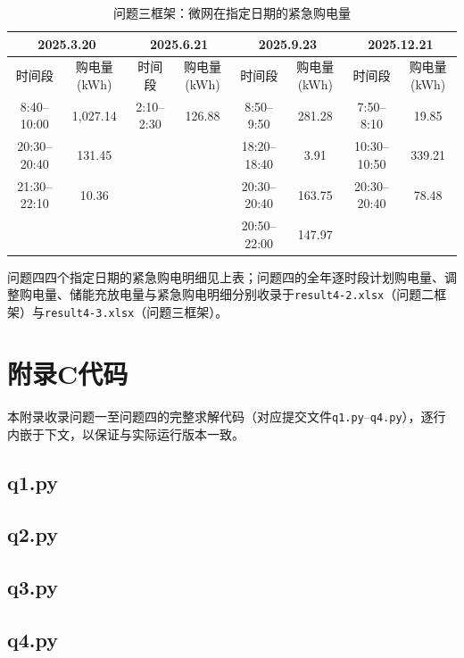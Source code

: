 \begin{table}[H]
  \centering
  \caption{问题三框架：微网在指定日期的紧急购电量}
  \label{tab:q4-3-specific-emergency}
  \tiny
  \renewcommand{\arraystretch}{1.2}
  \begin{tabular}{|c|c|c|c|c|c|c|c|}
    \hline
    \multicolumn{2}{|c|}{2025.3.20} & \multicolumn{2}{c|}{2025.6.21} & \multicolumn{2}{c|}{2025.9.23} & \multicolumn{2}{c|}{2025.12.21} \\
    \hline
    时间段 & 购电量(kWh) & 时间段 & 购电量(kWh) & 时间段 & 购电量(kWh) & 时间段 & 购电量(kWh) \\
    \hline
    8:40--10:00 & 1{,}027.14 & 2:10--2:30 & 126.88 & 8:50--9:50 & 281.28 & 7:50--8:10 & 19.85 \\
    \hline
    20:30--20:40 & 131.45 & & & 18:20--18:40 & 3.91 & 10:30--10:50 & 339.21 \\
    \hline
    21:30--22:10 & 10.36 & & & 20:30--20:40 & 163.75 & 20:30--20:40 & 78.48 \\
    \hline
    & & & & 20:50--22:00 & 147.97 & & \\
    \hline
  \end{tabular}
\end{table}

问题四四个指定日期的紧急购电明细见上表；问题四的全年逐时段计划购电量、调整购电量、储能充放电量与紧急购电明细分别收录于\texttt{result4-2.xlsx}（问题二框架）与\texttt{result4-3.xlsx}（问题三框架）。

\section*{附录C\quad 代码}

本附录收录问题一至问题四的完整求解代码（对应提交文件\texttt{q1.py}--\texttt{q4.py}），逐行内嵌于下文，以保证与实际运行版本一致。

\subsection*{q1.py}


\subsection*{q2.py}


\subsection*{q3.py}


\subsection*{q4.py}

